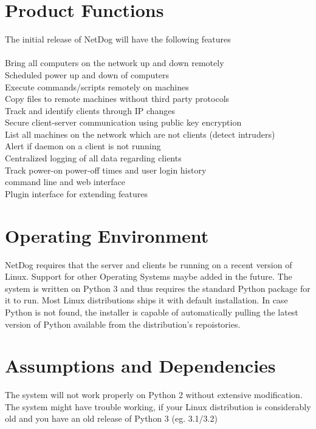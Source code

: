 \documentclass{scrreprt}
\begin{document}
\section{Product Functions}
\begin{itemsize}
    The initial release of NetDog will have the following features\\\\
    Bring all computers on the network up and down remotely\\
    Scheduled power up and down of computers\\
    Execute commands/scripts remotely on machines\\
    Copy files to remote machines without third party protocols\\
    Track and identify clients through IP changes\\
    Secure client-server communication using public key encryption\\
    List all machines on the network which are not clients (detect intruders)\\
    Alert if daemon on a client is not running\\
    Centralized logging of all data regarding clients\\
    Track power-on power-off times and user login history\\
    command line and web interface\\
    Plugin interface for extending features
\end{itemsize}

\section{Operating Environment}
NetDog requires that the server and clients be running on a recent version of
Linux. Support for other Operating Systems maybe added in the future. The
system is written on Python 3 and thus requires the standard Python package
for it to run. Most Linux distributions ships it with default installation. In
case Python is not found, the installer is capable of automatically pulling the
latest version of Python available from the distribution's repoistories.

\section{Assumptions and Dependencies}
The system will not work properly on Python 2 without extensive modification.
The system might have trouble working, if your Linux distribution is
considerably old and you have an old release of Python 3 (eg. 3.1/3.2)
\end{document}
